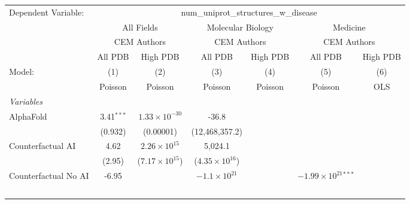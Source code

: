 \begingroup
\centering
\begin{tabular}{lcccccc}
   \tabularnewline \midrule \midrule
   Dependent Variable: & \multicolumn{6}{c}{num\_uniprot\_structures\_w\_disease}\\
 & \multicolumn{2}{c}{All Fields} & \multicolumn{2}{c}{Molecular Biology} & \multicolumn{2}{c}{Medicine} \\
\cmidrule(lr){2-3} \cmidrule(lr){4-5} \cmidrule(lr){6-7}
 & \multicolumn{2}{c}{CEM Authors} & \multicolumn{2}{c}{CEM Authors} & \multicolumn{2}{c}{CEM Authors} \\
\cmidrule(lr){2-3} \cmidrule(lr){4-5} \cmidrule(lr){6-7}
 & \multicolumn{1}{c}{All PDB} & \multicolumn{1}{c}{High PDB} & \multicolumn{1}{c}{All PDB} & \multicolumn{1}{c}{High PDB} & \multicolumn{1}{c}{All PDB} & \multicolumn{1}{c}{High PDB} \\
\cmidrule(lr){2-2} \cmidrule(lr){3-3} \cmidrule(lr){4-4} \cmidrule(lr){5-5} \cmidrule(lr){6-6} \cmidrule(lr){7-7}
   Model:                                                     & (1)          & (2)                     & (3)                     & (4)     & (5)                            & (6)\\  
                                                              &  Poisson     & Poisson                 & Poisson                 & Poisson & Poisson                        & OLS\\  
   \midrule
   \emph{Variables}\\
   AlphaFold                                                  & 3.41$^{***}$ & $1.33\times 10^{-30}$   & -36.8                   &         &                                &   \\   
                                                              & (0.932)      & (0.00001)               & (12,468,357.2)          &         &                                &   \\   
   Counterfactual AI                                          & 4.62         & $2.26\times 10^{15}$    & 5,024.1                 &         &                                &   \\   
                                                              & (2.95)       & ($7.17\times 10^{15}$)  & ($4.35\times 10^{16}$)  &         &                                &   \\   
   Counterfactual No AI                                       & -6.95        &                         & $-1.1\times 10^{21}$    &         & $-1.99\times 10^{21}$$^{***}$  &   \\   
$$
\end{tabular}
